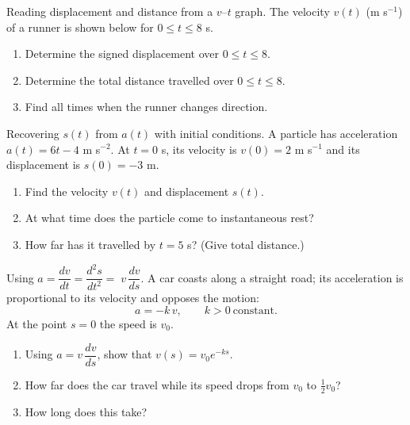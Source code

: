 \documentclass[11pt]{article}
\def\textbf#1{#1}%
\newcounter{question}
\begin{document}
\begin{question}
\textbf{Reading displacement and distance from a $v$--$t$ graph.}
The velocity $v(t)$ (m s$^{-1}$) of a runner is shown below for $0\le t\le 8$ s.
\begin{enumerate}
  \item Determine the signed displacement over $0\le t\le 8$.
  \item Determine the total distance travelled over $0\le t\le 8$.
  \item Find all times when the runner changes direction.
\end{enumerate}
\begin{center}
\end{center}
\end{question}

\begin{question}
\textbf{Recovering $s(t)$ from $a(t)$ with initial conditions.}
A particle has acceleration \(a(t)=6t-4\) m s$^{-2}$. At \(t=0\) s, its velocity is
\(v(0)=2\) m s$^{-1}$ and its displacement is \(s(0)=-3\) m.
\begin{enumerate}
  \item Find the velocity $v(t)$ and displacement $s(t)$.
  \item At what time does the particle come to instantaneous rest?
  \item How far has it travelled by $t=5$ s? (Give total distance.)
\end{enumerate}
\end{question}

\begin{question}
\textbf{Using \(a=\dfrac{dv}{dt}=\dfrac{d^{2}s}{dt^{2}}=\;v\,\dfrac{dv}{ds}\).}
A car coasts along a straight road; its acceleration is proportional to its velocity and opposes the motion:
\[
a=-k\,v,\qquad k>0\ \text{constant}.
\]
At the point \(s=0\) the speed is \(v_0\).
\begin{enumerate}
  \item Using \(a=v\,\dfrac{dv}{ds}\), show that \(v(s)=v_0 e^{-ks}\).
  \item How far does the car travel while its speed drops from \(v_0\) to \(\tfrac{1}{2}v_0\)?
  \item How long does this take?
\end{enumerate}
\end{question}
\end{document}
